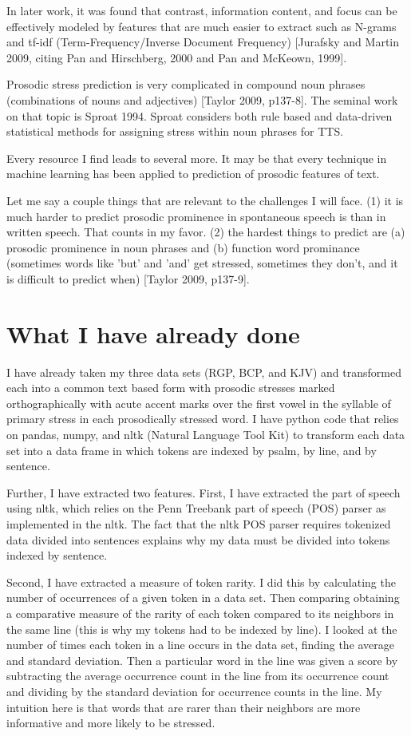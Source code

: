 \documentclass[12pt]{proposal}
\begin{document}
In later work, it was found that contrast, information content, and focus can be
effectively modeled by features that are much easier to extract such as N-grams
and tf-idf (Term-Frequency/Inverse Document Frequency) [Jurafsky and Martin
2009, citing Pan and Hirschberg, 2000 and Pan and McKeown, 1999].

Prosodic stress prediction is very complicated in compound noun phrases
(combinations of nouns and adjectives) [Taylor 2009, p137-8]. The seminal work
on that topic is Sproat 1994. Sproat considers both rule based and data-driven
statistical methods for assigning stress within noun phrases for TTS.

Every resource I find leads to several more.
It may be that every technique in machine learning has been applied to prediction of prosodic features of text.

Let me say a couple things that are relevant to the challenges I will face.  (1) it is much harder to predict prosodic prominence in spontaneous speech is than in written speech.
That counts in my favor. (2) the hardest things to predict are (a) prosodic prominence in noun phrases and (b) function word prominance (sometimes words like 'but' and 'and' get stressed, sometimes they don't, and it is difficult to predict when) [Taylor 2009, p137-9].


\section{What I have already done}

I have already taken my three data sets (RGP, BCP, and KJV) and transformed each into a common text based form with prosodic stresses marked orthographically with acute accent marks over the first vowel in the syllable of primary stress in each prosodically stressed word.
I have python code that relies on pandas, numpy, and nltk (Natural Language Tool Kit) to transform each data set into a data frame in which tokens are indexed by psalm, by line, and by sentence.

Further, I have extracted two features.
First, I have extracted the part of speech using nltk, which relies on the Penn Treebank part of speech (POS) parser as implemented in the nltk.
The fact that the nltk POS parser requires tokenized data divided into sentences explains why my data must be divided into tokens indexed by sentence.

Second, I have extracted a measure of token rarity.
I did this by calculating the number of occurrences of a given token in a data set.
Then comparing obtaining a comparative measure of the rarity of each token compared to its neighbors in the same line (this is why my tokens had to be indexed by line).
I looked at the number of times each token in a line occurs in the data set, finding the average and standard deviation.
Then a particular word in the line was given a score by subtracting the average occurrence count in the line from its occurrence count and dividing by the standard deviation for occurrence counts in the line.
My intuition here is that words that are rarer than their neighbors are more informative and more likely to be stressed.
\end{document}
